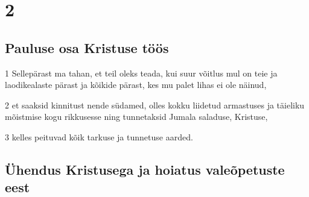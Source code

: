 \chapter{2}

\section*{Pauluse osa Kristuse töös}

\par 1 Sellepärast ma tahan, et teil oleks teada, kui suur võitlus mul on teie ja laodikealaste pärast ja kõikide pärast, kes mu palet lihas ei ole näinud,
\par 2 et saaksid kinnitust nende südamed, olles kokku liidetud armastuses ja täieliku mõistmise kogu rikkusesse ning tunnetaksid Jumala saladuse, Kristuse,
\par 3 kelles peituvad kõik tarkuse ja tunnetuse aarded.

\section*{Ühendus Kristusega ja hoiatus valeõpetuste eest}

